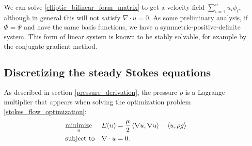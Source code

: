 We can solve \eqref{elliptic_bilinear_form_matrix} to get a velocity field $\sum_{i=1}^n u_i\phi_i$, although in general this will not satisfy $\nabla\cdot u = 0$.
As some preliminary analysis, if $\Phi = \Psi$ and have the same basis functions, we have a symmetric-positive-definite system. This form of linear system is known to be stably solvable,
for example by the conjugate gradient method.
\subsection{Discretizing the steady Stokes equations}\label{discretizing_steady_stokes}
As described in section \ref{pressure_derivation}, the pressure $p$ is a Lagrange multiplier that appears
when solving the optimization problem \eqref{stokes_flow_optimization}:
\begin{equation*}
\begin{aligned}
& \underset{u}{\text{minimize}}
& & E(u) =  \frac{\mu}{2} \left<\nabla u, \nabla u\right> - \left<u, \rho g\right>\\
& \text{subject to}
& & \nabla\cdot u = 0.
\end{aligned}
\end{equation*}

